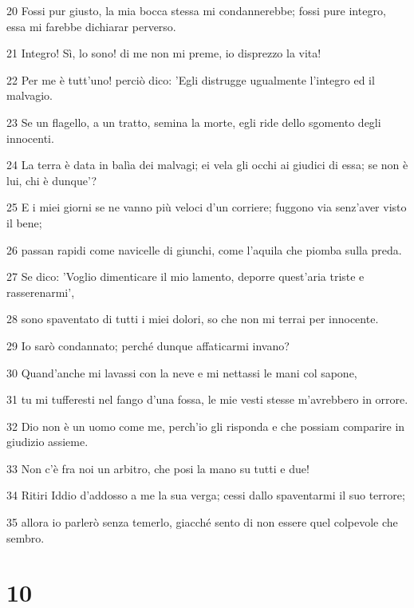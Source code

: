 \par 20 Fossi pur giusto, la mia bocca stessa mi condannerebbe; fossi pure integro, essa mi farebbe dichiarar perverso.
\par 21 Integro! Sì, lo sono! di me non mi preme, io disprezzo la vita!
\par 22 Per me è tutt'uno! perciò dico: 'Egli distrugge ugualmente l'integro ed il malvagio.
\par 23 Se un flagello, a un tratto, semina la morte, egli ride dello sgomento degli innocenti.
\par 24 La terra è data in balìa dei malvagi; ei vela gli occhi ai giudici di essa; se non è lui, chi è dunque'?
\par 25 E i miei giorni se ne vanno più veloci d'un corriere; fuggono via senz'aver visto il bene;
\par 26 passan rapidi come navicelle di giunchi, come l'aquila che piomba sulla preda.
\par 27 Se dico: 'Voglio dimenticare il mio lamento, deporre quest'aria triste e rasserenarmi',
\par 28 sono spaventato di tutti i miei dolori, so che non mi terrai per innocente.
\par 29 Io sarò condannato; perché dunque affaticarmi invano?
\par 30 Quand'anche mi lavassi con la neve e mi nettassi le mani col sapone,
\par 31 tu mi tufferesti nel fango d'una fossa, le mie vesti stesse m'avrebbero in orrore.
\par 32 Dio non è un uomo come me, perch'io gli risponda e che possiam comparire in giudizio assieme.
\par 33 Non c'è fra noi un arbitro, che posi la mano su tutti e due!
\par 34 Ritiri Iddio d'addosso a me la sua verga; cessi dallo spaventarmi il suo terrore;
\par 35 allora io parlerò senza temerlo, giacché sento di non essere quel colpevole che sembro.

\chapter{10}

